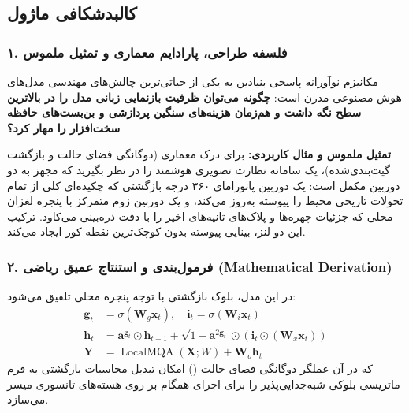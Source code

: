 \subsection{کالبدشکافی ماژول }

\subsubsection*{۱. فلسفه طراحی، پارادایم معماری و تمثیل ملموس}
مکانیزم نوآورانه  پاسخی بنیادین به یکی از حیاتی‌ترین چالش‌های مهندسی مدل‌های هوش مصنوعی مدرن است: \textbf{چگونه می‌توان ظرفیت بازنمایی زبانی مدل را در بالاترین سطح نگه داشت و هم‌زمان هزینه‌های سنگین پردازشی و بن‌بست‌های حافظه سخت‌افزار را مهار کرد؟}

\textbf{تمثیل ملموس و مثال کاربردی:}
برای درک معماری  (دوگانگی فضای حالت و بازگشت گیت‌بندی‌شده)، یک سامانه نظارت تصویری هوشمند را در نظر بگیرید که مجهز به دو دوربین مکمل است: یک دوربین پانورامای ۳۶۰ درجه بازگشتی که چکیده‌ای کلی از تمام تحولات تاریخی محیط را پیوسته به‌روز می‌کند، و یک دوربین زوم متمرکز با پنجره لغزان محلی که جزئیات چهره‌ها و پلاک‌های ثانیه‌های اخیر را با دقت ذره‌بینی می‌کاود. ترکیب این دو لنز، بینایی پیوسته بدون کوچک‌ترین نقطه کور ایجاد می‌کند.

\subsubsection*{۲. فرمول‌بندی و استنتاج عمیق ریاضی (Mathematical Derivation)}
در این مدل، بلوک بازگشتی  با توجه پنجره محلی تلفیق می‌شود:
\begin{align}
\mathbf{g}_t &= \sigma(\mathbf{W}_g \mathbf{x}_t), \quad \mathbf{i}_t = \sigma(\mathbf{W}_i \mathbf{x}_t) \\
\mathbf{h}_t &= \mathbf{a}^{\mathbf{g}_t} \odot \mathbf{h}_{t-1} + \sqrt{1 - \mathbf{a}^{2\mathbf{g}_t}} \odot (\mathbf{i}_t \odot (\mathbf{W}_x \mathbf{x}_t)) \\
\mathbf{Y} &= \operatorname{LocalMQA}(\mathbf{X}; W) + \mathbf{W}_o \mathbf{h}_t
\end{align}
که در آن عملگر دوگانگی فضای حالت () امکان تبدیل محاسبات بازگشتی به فرم ماتریسی بلوکی شبه‌جدایی‌پذیر را برای اجرای همگام بر روی هسته‌های تانسوری میسر می‌سازد.

